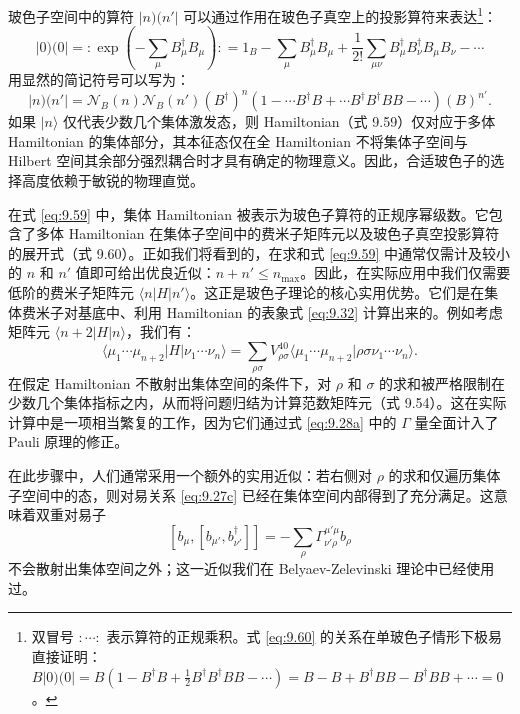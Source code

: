 玻色子空间中的算符 $|n)(n'|$ 可以通过作用在玻色子真空上的投影算符来表达\footnote{双冒号 ${:}\cdots{:}$ 表示算符的正规乘积。式 \ref{eq:9.60} 的关系在单玻色子情形下极易直接证明：$B|0)(0|=B(1-B^{\dagger}B+\frac{1}{2}B^{\dagger}B^{\dagger}BB-\cdots)=B-B+B^{\dagger}BB-B^{\dagger}BB+\cdots=0$。}：
\begin{equation}
|0)(0|={:}\exp\left(-\sum_{\mu}B^{\dagger}_{\mu}B_{\mu}\right){:}=1_{B}-\sum_{\mu}B^{\dagger}_{\mu}B_{\mu}+\frac{1}{2!}\sum_{\mu\nu}B^{\dagger}_{\mu}B^{\dagger}_{\nu}B_{\mu}B_{\nu}-\cdots\label{eq:9.60}
\end{equation}
用显然的简记符号可以写为：
\begin{equation}
|n)(n'|=\mathscr{N}_{B}(n)\mathscr{N}_{B}(n')(B^{\dagger})^{n}\left(1-\cdots B^{\dagger}B+\cdots B^{\dagger}B^{\dagger}BB-\cdots\right)(B)^{n'}.\label{eq:9.61}
\end{equation}
如果 $|n\rangle$ 仅代表少数几个集体激发态，则 Hamiltonian（式 9.59）仅对应于多体 Hamiltonian
的集体部分，其本征态仅在全 Hamiltonian 不将集体子空间与 Hilbert 空间其余部分强烈耦合时才具有确定的物理意义。因此，合适玻色子的选择高度依赖于敏锐的物理直觉。

在式 \ref{eq:9.59} 中，集体 Hamiltonian 被表示为玻色子算符的正规序幂级数。它包含了多体 Hamiltonian
在集体子空间中的费米子矩阵元以及玻色子真空投影算符的展开式（式 9.60）。正如我们将看到的，在求和式 \ref{eq:9.59}
中通常仅需计及较小的 $n$ 和 $n'$ 值即可给出优良近似：$n+n'\le n_{\text{max}}$。因此，在实际应用中我们仅需要低阶的费米子矩阵元
$\langle n|H|n'\rangle$。这正是玻色子理论的核心实用优势。它们是在集体费米子对基底中、利用 Hamiltonian
的表象式 \ref{eq:9.32} 计算出来的。例如考虑矩阵元 $\langle n+2|H|n\rangle$，我们有：
\begin{equation}
\langle\mu_{1}\cdots\mu_{n+2}|H|\nu_{1}\cdots\nu_{n}\rangle=\sum_{\rho\sigma}V^{40}_{\rho\sigma}\langle\mu_{1}\cdots\mu_{n+2}|\rho\sigma\nu_{1}\cdots\nu_{n}\rangle.\label{eq:9.62}
\end{equation}
在假定 Hamiltonian 不散射出集体空间的条件下，对 $\rho$ 和 $\sigma$ 的求和被严格限制在少数几个集体指标之内，从而将问题归结为计算范数矩阵元（式
9.54）。这在实际计算中是一项相当繁复的工作，因为它们通过式 \ref{eq:9.28a} 中的 $\Gamma$ 量全面计入了
Pauli 原理的修正。

在此步骤中，人们通常采用一个额外的实用近似：若右侧对 $\rho$ 的求和仅遍历集体子空间中的态，则对易关系 \ref{eq:9.27c}
已经在集体空间内部得到了充分满足。这意味着双重对易子
\begin{equation}
\left[b_{\mu},[b_{\mu'},b^{\dagger}_{\nu'}]\right]=-\sum_{\rho}\Gamma^{\mu'\mu}_{\nu'\rho}b_{\rho}\label{eq:9.63}
\end{equation}
不会散射出集体空间之外；这一近似我们在 Belyaev-Zelevinski 理论中已经使用过。

